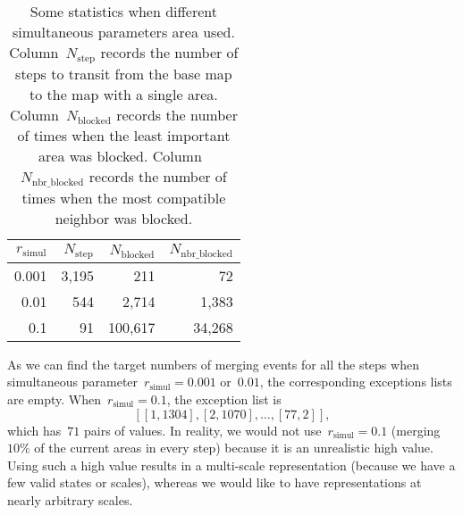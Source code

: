 \documentclass[twocolumn]{svjour3}          %
\begin{document}
\begin{table}[tb]
\centering
\caption{Some statistics when different simultaneous parameters area used.
    Column~$N_\mathrm{step}$ records the number of steps to transit 
    from the base map to the map with a single area.    
    Column~$N_\mathrm{blocked}$ records the number of times
    when the least important area was blocked.
    Column~$N_\mathrm{nbr\_blocked}$ records the number of times 
    when the most compatible neighbor was blocked.
}
\begin{tabular}{rrrr}
\toprule
$r_\mathrm{simul}$   & $N_\mathrm{step}$ & $N_\mathrm{blocked}$  & $N_\mathrm{nbr\_blocked}$ \\ \midrule
0.001                   &  3{,}195          &       211             &       72                  \\
0.01                    &  544              &   2{,}714             &  1{,}383                  \\
0.1                     &  91               & 100{,}617             & 34{,}268                  \\ 
\bottomrule 
\end{tabular}
\label{tbl:simultaneous_param_comparison}
\end{table}



As we can find the target numbers of merging events for all the steps
when simultaneous parameter~$r_\mathrm{simul}= 0.001$ or~$0.01$, 
the corresponding exceptions lists are empty.
When~$r_\mathrm{simul}= 0.1$,
the exception list is
$$[[1, 1304], [2, 1070], \dots, [77, 2]],$$
which has~$71$ pairs of values.
In reality, we would not use~$r_\mathrm{simul}= 0.1$
(merging~$10\%$ of the current areas in every step)
because it is an unrealistic high value.
Using such a high value results in a multi-scale representation
(because we have a few valid states or scales),
whereas we would like to have representations at nearly
arbitrary scales.

\end{document}
